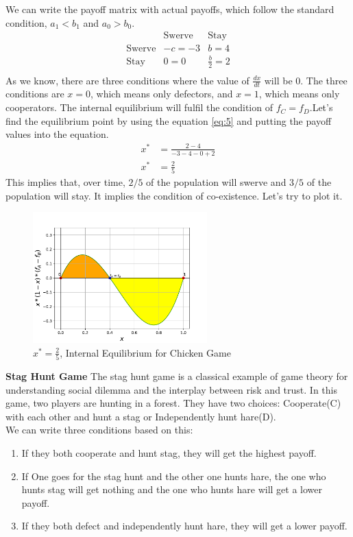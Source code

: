 \documentclass{article}
\begin{document}
We can write the payoff matrix with actual payoffs, which follow the standard condition, $a_1<b_1$ and $a_0>b_0$.
\[
\begin{array}{c|cc}
   & \text{Swerve} & \text{Stay} \\
  \hline
  \text{Swerve} & -c = -3 & b = 4 \\
  \text{Stay} & 0 = 0 & \frac{b}{2} = 2 \\
\end{array}
\]
As we know, there are three conditions where the value of $\frac{dx}{dt}$ will be $0$. The three conditions are $x=0$, which means only defectors, and $x=1$, which means only cooperators. The internal equilibrium will fulfil the condition of $f_C=f_D$.Let's find the equilibrium point by using the equation \eqref{eq:5} and putting the payoff values into the equation.
\begin{align}
x^*&= \frac{2-4}{-3-4-0+2} \nonumber\\
x^*&= \frac{2}{5} \nonumber
\end{align}
This implies that, over time, $2/5$ of the population will swerve and $3/5$ of the population will stay. It implies the condition of co-existence. Let's try to plot it.
\begin{figure}[H]
    \centering
    \includegraphics[width=0.6\textwidth]{CG.pdf}
    \caption{$x^*=\frac{2}{5}$, Internal Equilibrium for Chicken Game}
    \label{fig:2}
\end{figure}
\textbf{Stag Hunt Game}
\newline
The stag hunt game is a classical example of game theory for understanding social dilemma and the interplay between risk and trust.
In this game, two players are hunting in a forest. They have two choices: Cooperate(C) with each other and hunt a stag or Independently hunt hare(D).\\
We can write three conditions based on this:
\begin{enumerate}
\item If they both cooperate and hunt stag, they will get the highest payoff.
\item If One goes for the stag hunt and the other one hunts hare, the one who hunts stag will get nothing and the one who hunts hare will get a lower payoff.
\item If they both defect and independently hunt hare, they will get a lower payoff.
\end{enumerate}
\end{document}
